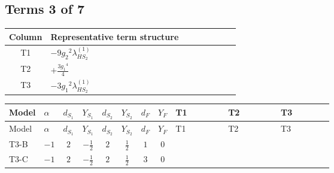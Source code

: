 \documentclass[8pt]{article}
\begin{document}
\begin{landscape}
\subsection*{Terms 3 of 7}
\begin{center}
\begin{tabular}{@{}c >{\raggedright\arraybackslash}p{0.82\linewidth}@{}}
\toprule
Column & Representative term structure \\
\midrule
T1 & \(\displaystyle -9 {g_2}^2 {\lambda_{HS_2}^{(1)}}\) \\
\midrule
T2 & \(\displaystyle +\frac{3 {g_1}^4}{4}\) \\
\midrule
T3 & \(\displaystyle -3 {g_1}^2 {\lambda_{HS_2}^{(1)}}\) \\
\midrule
\bottomrule
\end{tabular}
\end{center}
\smallskip
\tiny
\begin{longtable}{@{}llcccccc >{\raggedright\arraybackslash}p{0.21\linewidth} >{\raggedright\arraybackslash}p{0.21\linewidth} >{\raggedright\arraybackslash}p{0.21\linewidth}@{}}
\toprule
Model & $\alpha$ & $d_{S_1}$ & $Y_{S_1}$ & $d_{S_2}$ & $Y_{S_2}$ & $d_F$ & $Y_F$ & T1 & T2 & T3 \\
\midrule
\endfirsthead
\toprule
Model & $\alpha$ & $d_{S_1}$ & $Y_{S_1}$ & $d_{S_2}$ & $Y_{S_2}$ & $d_F$ & $Y_F$ & T1 & T2 & T3 \\
\midrule
\endhead
T3-B & $-1$ & $2$ & $-\frac{1}{2}$ & $2$ & $\frac{1}{2}$ & $1$ & $0$ & \scriptsize\adjustbox{max width=\linewidth}{$\begin{gathered} -9 {g_2}^2 {\lambda_{HS_2}^{(1)}}\end{gathered}$} & \scriptsize\adjustbox{max width=\linewidth}{$\begin{gathered} +\frac{3 {g_1}^4}{4}\end{gathered}$} & \scriptsize\adjustbox{max width=\linewidth}{$\begin{gathered} -3 {g_1}^2 {\lambda_{HS_2}^{(1)}}\end{gathered}$} \\
\midrule
T3-C & $-1$ & $2$ & $-\frac{1}{2}$ & $2$ & $\frac{1}{2}$ & $3$ & $0$ & \scriptsize\adjustbox{max width=\linewidth}{$\begin{gathered} -9 {g_2}^2 {\lambda_{HS_2}^{(1)}}\end{gathered}$} & \scriptsize\adjustbox{max width=\linewidth}{$\begin{gathered} +\frac{3 {g_1}^4}{4}\end{gathered}$} & \scriptsize\adjustbox{max width=\linewidth}{$\begin{gathered} -3 {g_1}^2 {\lambda_{HS_2}^{(1)}}\end{gathered}$} \\

\end{longtable}
\end{landscape}
\end{document}
